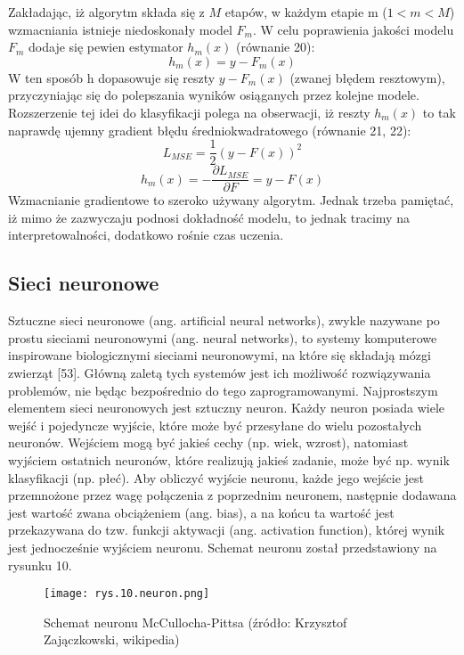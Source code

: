 \noindent Zakładając, iż algorytm składa się z $M$ etapów, w każdym etapie m ($1<m<M$) wzmacniania istnieje niedoskonały model $F_m$. W celu poprawienia jakości modelu $ F_m$ dodaje się pewien estymator $h_m(x)$ (równanie 20):
\begin{equation}
h_m(x)=y-F_m(x)
\end{equation}
W ten sposób h dopasowuje się reszty $y-F_m(x)$ (zwanej błędem resztowym), przyczyniając się do polepszania wyników osiąganych przez kolejne modele. Rozszerzenie tej idei do klasyfikacji polega na obserwacji, iż reszty $h_m(x)$ to tak naprawdę ujemny gradient błędu średniokwadratowego (równanie 21, 22):
\begin{equation}
L_{MSE}=\frac 1 2(y-F(x))^2
\end{equation}
\begin{equation}
h_m(x)=-\frac {\partial L_{MSE}} {\partial F}=y-F(x)
\end{equation}
Wzmacnianie gradientowe to szeroko używany algorytm. Jednak trzeba pamiętać, iż mimo że zazwyczaju podnosi dokładność modelu, to jednak tracimy na interpretowalności, dodatkowo rośnie czas uczenia.

\subsection{Sieci neuronowe}
\label{cha:Siecineuronowe}

Sztuczne sieci neuronowe (ang. artificial neural networks), zwykle nazywane po prostu sieciami neuronowymi (ang. neural networks), to systemy komputerowe inspirowane biologicznymi sieciami neuronowymi, na które się składają mózgi zwierząt [53]. Główną zaletą tych systemów jest ich możliwość rozwiązywania problemów, nie będąc bezpośrednio do tego zaprogramowanymi. Najprostszym elementem sieci neuronowych jest sztuczny neuron. Każdy neuron posiada wiele wejść i pojedyncze wyjście, które może być przesyłane do wielu pozostałych neuronów. Wejściem mogą być jakieś cechy (np. wiek, wzrost), natomiast wyjściem ostatnich neuronów, które realizują jakieś zadanie, może być np. wynik klasyfikacji (np. płeć). Aby obliczyć wyjście neuronu, każde jego wejście jest przemnożone przez wagę połączenia z poprzednim neuronem, następnie dodawana jest wartość zwana obciążeniem (ang. bias), a na końcu ta wartość jest przekazywana do tzw. funkcji aktywacji (ang. activation function), której wynik jest jednocześnie wyjściem neuronu. Schemat neuronu został przedstawiony na rysunku 10.
\begin{figure}[h]
    \centering
    \texttt{[image: rys.10.neuron.png]}
    \caption{Schemat neuronu McCullocha-Pittsa (źródło: Krzysztof Zajączkowski, wikipedia)}
    \label{fig:mesh10}
\end{figure}

